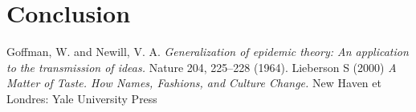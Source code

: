 \documentclass[letterpaper,10pt]{article}
\begin{document}
\section{Conclusion}



\begin{thebibliography}{9}

Goffman, W. and Newill, V. A. 
\textit{Generalization of epidemic theory: An application to the transmission of ideas.} Nature 204, 225–228 (1964).
Lieberson S (2000) 
\textit{A Matter of Taste. How Names, Fashions, and Culture Change.}
New Haven et Londres: Yale University Press

\end{thebibliography}
\end{document}
